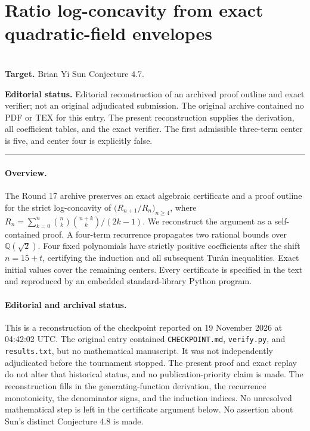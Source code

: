 \documentclass[11pt,a4paper]{article}
\begin{document}
\clearpage

\section{Ratio log-concavity from exact quadratic-field envelopes}
\label{section:R17R}
\\[3pt]
\noindent\textbf{Target.} Brian Yi Sun Conjecture 4.7.

\noindent\textbf{Editorial status.} Editorial reconstruction of an archived proof outline and exact verifier; not an original adjudicated submission. The original archive contained no PDF or TEX for this entry. The present reconstruction supplies the derivation, all coefficient tables, and the exact verifier. The first admissible three-term center is five, and center four is explicitly false.

\smallskip\hrule\medskip



\begingroup
\newcommand{\Z}{\mathbb Z}
\newcommand{\Q}{\mathbb Q}
\setcounter{equation}{0}
\renewcommand{\theequation}{\thesection.\arabic{equation}}
\renewcommand{\theHequation}{R17R.\arabic{equation}}
\paragraph{Overview.}
The Round 17 archive preserves an exact algebraic certificate and a
proof outline for the strict log-concavity of
$\bigl(R_{n+1}/R_n\bigr)_{n\ge4}$, where
$R_n=\sum_{k=0}^n\binom nk\binom{n+k}k/(2k-1)$.
We reconstruct the argument as a self-contained proof. A four-term
recurrence propagates two rational bounds over $\Q(\sqrt2)$.
Four fixed polynomials have strictly positive coefficients after the
shift $n=15+t$, certifying the induction and all subsequent Tur\'an
inequalities. Exact initial values cover the remaining centers.
Every certificate is specified in the text and reproduced by an
embedded standard-library Python program.


\paragraph{Editorial and archival status.}
This is a reconstruction of the checkpoint reported on
19 November 2026 at 04:42:02 UTC. The original entry contained
\texttt{CHECKPOINT.md}, \texttt{verify.py}, and \texttt{results.txt},
but no mathematical manuscript. It was not independently adjudicated
before the tournament stopped. The present proof and exact replay do
not alter that historical status, and no publication-priority claim
is made. The reconstruction fills in the generating-function derivation,
the recurrence monotonicity, the denominator signs, and the induction
indices. No unresolved mathematical step is left in the certificate
argument below. No assertion about Sun's distinct Conjecture 4.8 is made.
\end{document}
